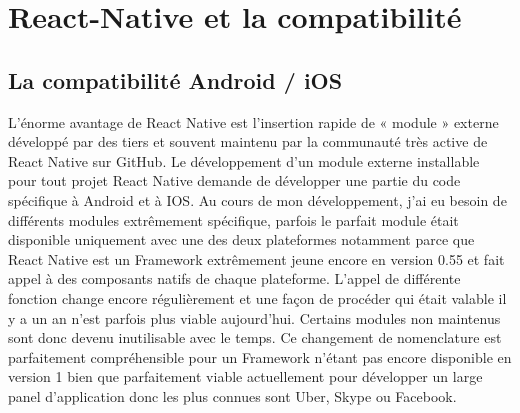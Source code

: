 \chapter{React-Native et la compatibilité}
\label{sec:React-Native et la compatibilité}




\section{La compatibilité Android / iOS }


L’énorme avantage de React Native est l’insertion rapide de « module » externe développé par des tiers et souvent maintenu par la communauté très active de React Native sur GitHub. Le développement d’un module externe installable pour tout projet React Native demande de développer une partie du code spécifique à Android et à IOS. Au cours de mon développement, j’ai eu besoin de différents modules extrêmement spécifique, parfois le parfait module était disponible uniquement avec une des deux plateformes notamment parce que React Native est un Framework extrêmement jeune encore en version 0.55 et fait appel à des composants natifs de chaque plateforme. L’appel de différente fonction change encore régulièrement et une façon de procéder qui était valable il y a un an n’est parfois plus viable aujourd’hui. Certains modules non maintenus sont donc devenu inutilisable avec le temps. Ce changement de nomenclature est parfaitement compréhensible pour un Framework n’étant pas encore disponible en version 1 bien que parfaitement viable actuellement pour développer un large panel d’application donc les plus connues sont Uber, Skype ou Facebook. 
